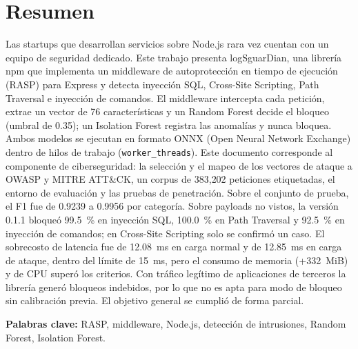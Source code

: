 \ifdefined\modoensamble
\else
	
	\chapter*{Resumen}
\fi

Las startups que desarrollan servicios sobre Node.js rara vez cuentan con un equipo de seguridad dedicado. Este trabajo presenta logSguarDian, una librería npm que implementa un middleware de autoprotección en tiempo de ejecución (RASP) para Express y detecta inyección SQL, Cross-Site Scripting, Path Traversal e inyección de comandos. El middleware intercepta cada petición, extrae un vector de 76 características y un Random Forest decide el bloqueo (umbral de 0.35); un Isolation Forest registra las anomalías y nunca bloquea. Ambos modelos se ejecutan en formato ONNX (Open Neural Network Exchange) dentro de hilos de trabajo (\texttt{worker\_threads}). Este documento corresponde al componente de ciberseguridad: la selección y el mapeo de los vectores de ataque a OWASP y MITRE ATT\&CK, un corpus de 383{,}202 peticiones etiquetadas, el entorno de evaluación y las pruebas de penetración. Sobre el conjunto de prueba, el F1 fue de 0.9239 a 0.9956 por categoría. Sobre payloads no vistos, la versión 0.1.1 bloqueó 99.5~\% en inyección SQL, 100.0~\% en Path Traversal y 92.5~\% en inyección de comandos; en Cross-Site Scripting solo se confirmó un caso. El sobrecosto de latencia fue de 12.08~ms en carga normal y de 12.85~ms en carga de ataque, dentro del límite de 15~ms, pero el consumo de memoria (+332~MiB) y de CPU superó los criterios. Con tráfico legítimo de aplicaciones de terceros la librería generó bloqueos indebidos, por lo que no es apta para modo de bloqueo sin calibración previa. El objetivo general se cumplió de forma parcial.

\medskip
\noindent\textbf{Palabras clave:} RASP, middleware, Node.js, detección de intrusiones, Random Forest, Isolation Forest.

\ifdefined\modoensamble
\else
	
\fi

